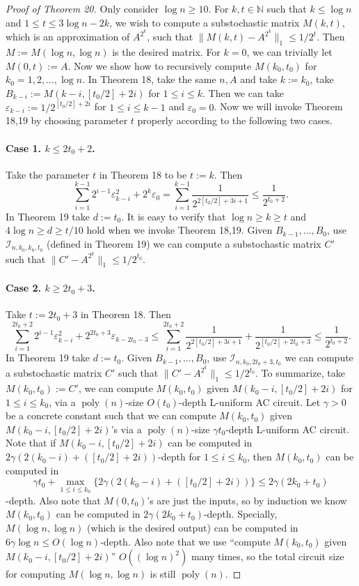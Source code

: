 \documentclass[10pt,a4paper]{article}
\begin{document}
\begin{proof}[Proof of Theorem 20]
Only consider $\log n\ge10$. For $k,t\in\mathbb N$ such that $k\le\log n$ and $1\le t\le3\log n-2k$, we wish to compute a substochastic matrix $M(k,t)$, which is an approximation of $A^{2^k}$, such that $\|M(k,t)-A^{2^k}\|_1\le1/2^t$. Then $M:=M(\log n,\log n)$ is the desired matrix.
For $k=0$, we can trivially let $M(0,t):=A$. Now we show how to recursively compute $M(k_0,t_0)$ for $k_0=1,2,\ldots,\log n$.
In Theorem 18, take the same $n,A$ and take $k:=k_0$, take $B_{k-i}:=M(k-i,[t_0/2]+2i)$ for $1\le i\le k$. Then we can take $\varepsilon_{k-i}:=1/2^{[t_0/2]+2i}$ for $1\le i\le k-1$ and $\varepsilon_0=0$. Now we will invoke Theorem 18,19 by choosing parameter $t$ properly according to the following two cases.
\paragraph{Case 1. $k\le2t_0+2$.}
Take the parameter $t$ in Theorem 18 to be $t:=k$. Then
\[\sum_{i=1}^{k-1}2^{i-1}\varepsilon_{k-i}^2+2^k\varepsilon_0=\sum_{i=1}^{k-1}\frac1{2^{2[t_0/2]+3i+1}}\le\frac1{2^{t_0+2}}.\]
In Theorem 19 take $d:=t_0$. It is easy to verify that $\log n\ge k\ge t$ and $4\log n\ge d\ge t/10$ hold when we invoke Theorem 18,19. Given $B_{k-1},\ldots,B_0$, use $\mathcal I_{n,k_0,k_0,t_0}$ (defined in Theorem 19) we can compute a substochastic matrix $C'$ such that $\|C'-A^{2^k}\|_1\le1/2^{t_0}$.
\paragraph{Case 2. $k\ge2t_0+3$.}
Take $t:=2t_0+3$ in Theorem 18. Then
\[\sum_{i=1}^{2t_0+2}2^{i-1}\varepsilon_{k-i}^2+2^{2t_0+3}\varepsilon_{k-2t_0-3}\le\sum_{i=1}^{2t_0+2}\frac1{2^{2[t_0/2]+3i+1}}+\frac1{2^{[t_0/2]+2t_0+3}}\le\frac1{2^{t_0+2}}.\]
In Theorem 19 take $d:=t_0$. Given $B_{k-1},\ldots,B_0$, use $\mathcal I_{n,k_0,2t_0+3,t_0}$ we can compute a substochastic matrix $C'$ such that $\|C'-A^{2^k}\|_1\le1/2^{t_0}$.
To summarize, take $M(k_0,t_0):=C'$, we can compute $M(k_0,t_0)$ given $M(k_0-i,[t_0/2]+2i)$ for $1\le i\le k_0$, via a $\operatorname{poly}(n)$-size $O(t_0)$-depth L-uniform AC circuit.
Let $\gamma>0$ be a concrete constant such that we can compute $M(k_0,t_0)$ given $M(k_0-i,[t_0/2]+2i)$'s via a $\operatorname{poly}(n)$-size $\gamma t_0$-depth L-uniform AC circuit. Note that if $M(k_0-i,[t_0/2]+2i)$ can be computed in $2\gamma(2(k_0-i)+([t_0/2]+2i))$-depth for $1\le i\le k_0$, then $M(k_0,t_0)$ can be computed in
\[\gamma t_0+\max_{1\le i\le k_0}\{2\gamma(2(k_0-i)+([t_0/2]+2i))\}\le2\gamma(2k_0+t_0)\]
-depth. Also note that $M(0,t_0)$'s are just the inputs, so by induction we know $M(k_0,t_0)$ can be computed in $2\gamma(2k_0+t_0)$-depth. Specially, $M(\log n,\log n)$ (which is the desired output) can be computed in $6\gamma\log n\le O(\log n)$-depth. Also note that we use ``compute $M(k_0,t_0)$ given $M(k_0-i,[t_0/2]+2i)$'' $O((\log n)^2)$ many times, so the total circuit size for computing $M(\log n,\log n)$ is still $\operatorname{poly}(n)$.
\end{proof}
\end{document}
